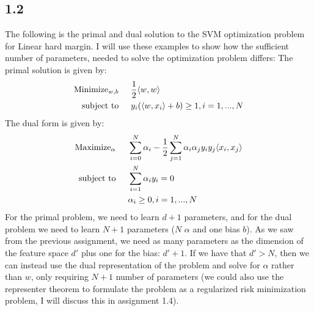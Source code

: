 \documentclass{article}
\begin{document}
\subsection{1.2}
The following is the primal and dual solution to the SVM optimization problem for Linear hard margin. I will use these examples to show how the sufficient number of parameters, needed to solve the optimization problem differs:
The primal solution is given by:
\begin{align}
\text{Minimize}_{w,b} \hspace{0.5cm} & \dfrac{1}{2} \langle w,w \rangle \\
\text{subject to} \hspace{0.5cm}& y_i (\langle w,x_i \rangle + b ) \geq 1 , i = 1,...,N
\end{align}
The dual form is given by:
\begin{align}
\text{Maximize}_\alpha \hspace{0.5cm}& \sum\limits_{i=0}^N \alpha_i - \frac{1}{2} \sum\limits_{j=1}^N \alpha_i \alpha_j y_i y_j \langle x_i, x_j \rangle \\
\text{subject to} \hspace{0.5cm}& \sum\limits_{i=1}^N \alpha_iy_i = 0 \\
 \hspace{0.5cm}& \alpha_i \geq 0 ,i =1,...,N
\end{align}
For the primal problem, we need to learn $d+1$ parameters, and for the dual problem we need to learn $N+1$ parameters ($N$ $\alpha$ and one bias $b$).
As we saw from the previous assignment, we need as many parameters as the dimension of the feature space $d'$ plus one for the bias: $d'+1$. If we have that $d' > N$, then we can instead use the dual representation of the problem and solve for $\alpha$ rather than $w$, only requiring $N+1$ number of parameters (we could also use the representer theorem to formulate the problem as a regularized risk minimization problem, I will discuss this in assignment 1.4).
\end{document}

